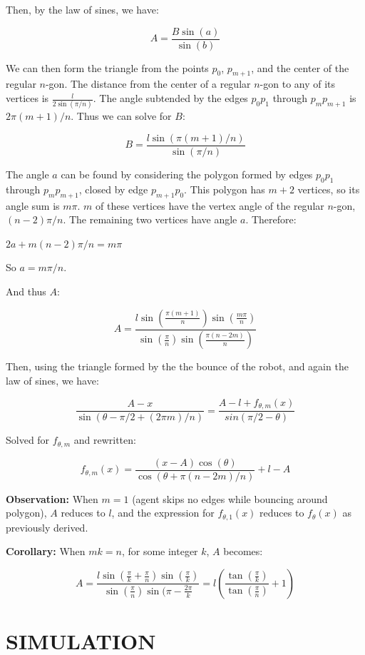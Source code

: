 \documentclass[letterpaper, 10 pt, conference]{ieeeconf}  %
\begin{document}
Then, by the law of sines, we have:

$$ A = \frac{B \sin(a)}{\sin(b)} $$

We can then form the triangle from the points $p_0$, $p_{m+1}$, and the center
of the regular $n$-gon. The distance from the center of a regular $n$-gon to any
of its vertices is $\frac{l}{2 \sin(\pi/n)}$. The angle subtended by the edges
$p_0 p_1$ through $p_m p_{m+1}$ is $2 \pi (m+1)/n$. Thus we can solve for $B$:

$$ B = \frac{l \sin( \pi (m+1) /n)}{\sin (\pi / n)} $$

The angle $a$ can be found by considering the polygon formed by edges $p_0 p_1$
through $p_m p_{m+1}$, closed by edge $p_{m+1} p_0$. This polygon has $m+2$
vertices, so its angle sum is $m \pi$. $m$ of these vertices have the vertex
angle of the regular $n$-gon, $(n-2) \pi /n$. The remaining two vertices have
angle $a$. Therefore:

$2a + m(n-2)\pi/n = m \pi$

So $a = m \pi / n$.

And thus $A$:

$$ A = \frac{l \sin(\frac{\pi(m+1)}{n}) \sin( \frac{m \pi}{n} )}{ \sin(
\frac{\pi}{n} ) \sin( \frac{\pi(n-2m)}{n} ) } $$

Then, using the triangle formed by the the bounce of the robot, and again the
law of sines, we have:

$$ \frac{A-x}{\sin( \theta - \pi/2 + (2 \pi m)/n )} = \frac{ A - l +
f_{\theta, m}(x)}{sin(\pi/2 - \theta)} $$

Solved for $f_{\theta, m}$ and rewritten:

$$ f_{\theta, m}(x) =\frac{(x-A) \cos(\theta)}{\cos(\theta + \pi(n-2m)/n)} + l -A$$

\textbf{Observation:} When $m=1$ (agent skips no edges while bouncing around polygon), $A$
reduces to $l$, and the expression for $f_{\theta, 1}(x)$ reduces to $f_{\theta}(x)$ as 
previously derived.

\textbf{Corollary:} When $mk=n$, for some integer $k$, $A$ becomes:

\[ A = \frac{l \sin(\frac{\pi}{k} + \frac{\pi}{n}) \sin( \frac{\pi}{k} )}{ \sin(
    \frac{\pi}{n} ) \sin( \pi - \frac{2\pi}{k} } = l \left(
    \frac{\tan(\frac{\pi}{k})}{\tan(\frac{\pi}{n})} +1 \right) \]

\section{SIMULATION}
\end{document}
